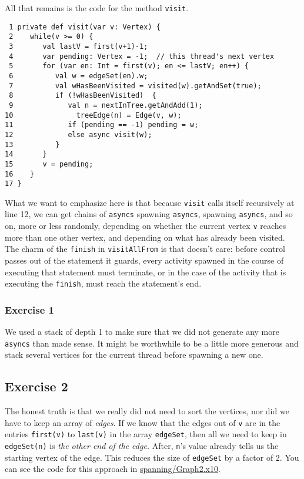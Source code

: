All that remains is the code for the method {\tt visit}.
\begin{verbatim}
 1 private def visit(var v: Vertex) {
 2    while(v >= 0) {
 3       val lastV = first(v+1)-1;
 4       var pending: Vertex = -1;  // this thread's next vertex
 5       for (var en: Int = first(v); en <= lastV; en++) {
 6          val w = edgeSet(en).w;
 7          val wHasBeenVisited = visited(w).getAndSet(true);
 8          if (!wHasBeenVisited)  {
 9             val n = nextInTree.getAndAdd(1);
10               treeEdge(n) = Edge(v, w);
11             if (pending == -1) pending = w; 
12             else async visit(w);           
13          }
14       }
15       v = pending; 
16    }
17 }
\end{verbatim}
What we want to emphasize here is that because {\tt visit} calls itself
recursively at line 12, we can get chains of {\tt asyncs} spawning {\tt asyncs},
spawning {\tt asyncs}, and so on, more or less randomly, depending on whether the
current vertex {\tt v} reaches more than one other vertex, and depending on
what has already been visited.  The charm of the {\tt finish} in
{\tt visitAllFrom} is that doesn't care: before control passes out of
the statement it guards, every activity spawned in the course of executing that
statement must terminate, or in the case of the activity that is executing the
{\tt finish}, must reach the statement's end.

\subsubsection{Exercise 1} We used a stack of depth 1 to make sure that we did
not generate any more {\tt asyncs} than made sense.  It might be worthwhile to be a
little more generous and stack several vertices for the current thread before
spawning a new one.

\subsection{Exercise 2} The honest truth is that we really did not need to sort
the vertices, nor did we have to keep an array of {\em edges}.  If we know that
the edges out of {\tt v} are in the entries {\tt first(v)} to {\tt last(v)} in
the array {\tt edgeSet}, then all we need to keep in {\tt edgeSet(n)} is {\em
the other end of the edge.}  After, {\tt n}'s value already tells us the
starting vertex of the edge.  This reduces the size of {\tt edgeSet} by a factor
of 2.  You can see the code for this approach in 
\href{http://dist.codehaus.org/x10/documentation/guide/src/spanning/Graph2.x10}{spanning/Graph2.x10}.

